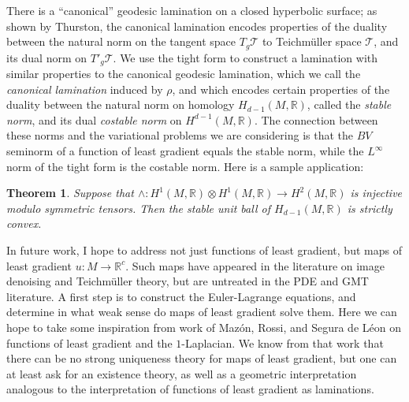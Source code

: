 \documentclass[11pt]{article}
\theoremstyle{plain} \numberwithin{equation}{section}
\newtheorem{theorem}{Theorem}%
\theoremstyle{definition}
\begin{document}
There is a ``canonical'' geodesic lamination on a closed hyperbolic surface; as shown by Thurston, the canonical lamination encodes properties of the duality between the natural norm on the tangent space $T_g\mathcal T$ to Teichm\"uller space $\mathcal T$, and its dual norm on $T'_g \mathcal T$.
We use the tight form to construct a lamination with similar properties to the canonical geodesic lamination, which we call the \emph{canonical lamination} induced by $\rho$, and which encodes certain properties of the duality between the natural norm on homology $H_{d - 1}(M, \mathbb R)$, called the \emph{stable norm}, and its dual \emph{costable norm} on $H^{d - 1}(M, \mathbb R)$.
The connection between these norms and the variational problems we are considering is that the $BV$ seminorm of a function of least gradient equals the stable norm, while the $L^\infty$ norm of the tight form is the costable norm.
Here is a sample application:

\begin{theorem}
Suppose that $\wedge: H^1(M, \mathbb R) \otimes H^1(M, \mathbb R) \to H^2(M, \mathbb R)$ is injective modulo symmetric tensors.
Then the stable unit ball of $H_{d - 1}(M, \mathbb R)$ is strictly convex.
\end{theorem}

In future work, I hope to address not just functions of least gradient, but maps of least gradient $u: M \to \mathbb R^c$.
Such maps have appeared in the literature on image denoising and Teichm\"uller theory, but are untreated in the PDE and GMT literature.
A first step is to construct the Euler-Lagrange equations, and determine in what weak sense do maps of least gradient solve them.
Here we can hope to take some inspiration from work of Maz\'on, Rossi, and Segura de L\'eon on functions of least gradient and the $1$-Laplacian.
We know from that work that there can be no strong uniqueness theory for maps of least gradient, but one can at least ask for an existence theory, as well as a geometric interpretation analogous to the interpretation of functions of least gradient as laminations.
\end{document}

